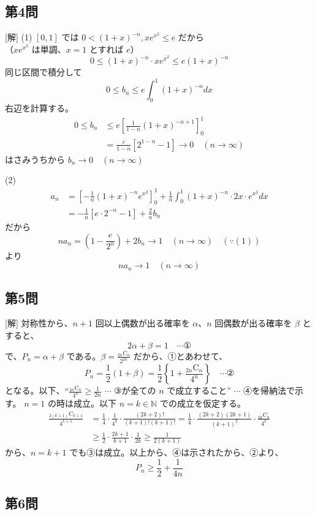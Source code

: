 \documentclass[../main.tex]{subfiles}
\begin{document}
\subsection*{第4問}
[解]
(1) $[0, 1]$ では $0 < (1+x)^{-n}, x e^{x^2} \le e$ だから\\
（$x e^{x^2}$ は単調、$x=1$ とすれば $e$）
\[
  0 \le (1+x)^{-n} \cdot x e^{x^2} \le e(1+x)^{-n}
\]
同じ区間で積分して
\[
  0 \le b_n \le e \int_0^1 (1+x)^{-n} dx
\]
右辺を計算する。
\begin{align*}
  0 \le b_n &\le e \left[ \frac{1}{1-n}(1+x)^{-n+1} \right]_0^1 \\
  &= \frac{e}{1-n} \left[ 2^{1-n} - 1 \right] \to 0 \quad (n \to \infty)
\end{align*}
はさみうちから $b_n \to 0 \quad (n \to \infty)$

(2)
\begin{align*}
  a_n &= \left[ -\frac{1}{n}(1+x)^{-n} e^{x^2} \right]_0^1 + \frac{1}{n} \int_0^1 (1+x)^{-n} \cdot 2x \cdot e^{x^2} dx \\
  &= -\frac{1}{n} \left[ e \cdot 2^{-n} - 1 \right] + \frac{2}{n} b_n
\end{align*}
だから
\[
  n a_n = \left( 1 - \frac{e}{2^n} \right) + 2 b_n \to 1 \quad (n \to \infty) \quad (\because (1))
\]
より
\[
  n a_n \to 1 \quad (n \to \infty)
\]

\subsection*{第5問}
[解] 対称性から、$n+1$ 回以上偶数が出る確率を $\alpha$、$n$ 回偶数が出る確率を $\beta$ とすると、
\[
  2\alpha + \beta = 1 \quad \cdots \text{①}
\]
で、$P_n = \alpha + \beta$ である。$\beta = \frac{{}_{2n}\text{C}_n}{2^{2n}}$ だから、①とあわせて、
\[
  P_n = \frac{1}{2}(1+\beta) = \frac{1}{2} \left\{ 1 + \frac{{}_{2n}\text{C}_n}{4^n} \right\} \quad \cdots \text{②}
\]
となる。以下、“$\frac{{}_{2n}\text{C}_n}{4^n} \ge \frac{1}{2n}$ $\cdots$ ③が全ての $n$ で成立すること” $\cdots$ ④を帰納法で示す。
$n=1$ の時は成立。以下 $n=k \in \mathbb{N}$ での成立を仮定する。
\begin{align*}
  \frac{{}_{2(k+1)}\text{C}_{k+1}}{4^{k+1}} &= \frac{1}{4} \cdot \frac{1}{4^k} \cdot \frac{(2k+2)!}{(k+1)!(k+1)!} = \frac{1}{4} \cdot \frac{(2k+2)(2k+1)}{(k+1)^2} \cdot \frac{{}_{2k}\text{C}_k}{4^k} \\
  &\ge \frac{1}{2} \cdot \frac{2k+1}{k+1} \cdot \frac{1}{2k} \ge \frac{1}{2(k+1)}
\end{align*}
から、$n=k+1$ でも③は成立。以上から、④は示されたから、②より、
\[
  P_n \ge \frac{1}{2} + \frac{1}{4n}
\]

\subsection*{第6問}
\end{document}
